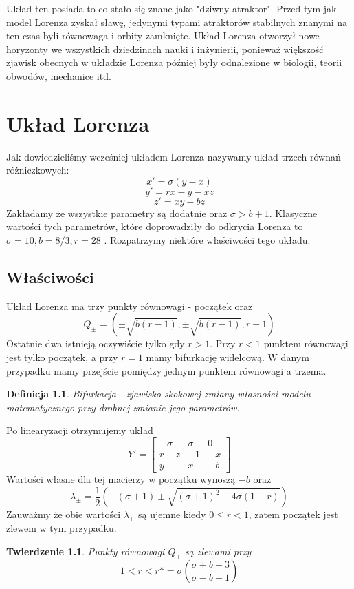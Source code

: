 \documentclass[12pt]{report}
\newtheorem{theorem}{Twierdzenie}
\newtheorem{definition}{Definicja}
\begin{document}
	\par Układ ten posiada to co stało się znane jako "dziwny atraktor". Przed tym jak model Lorenza zyskał sławę, jedynymi typami atraktorów stabilnych znanymi na ten czas byli równowaga i orbity zamknięte. Układ Lorenza otworzył nowe horyzonty we wszystkich dziedzinach nauki i inżynierii, ponieważ większość zjawisk obecnych w układzie Lorenza później były odnalezione w biologii, teorii obwodów, mechanice itd. \cite{HSD}

\chapter{Układ Lorenza}
	\par Jak dowiedzieliśmy wcześniej układem Lorenza nazywamy układ trzech równań różniczkowych:
		\[ x' = \sigma (y - x) \]
		\[ y' = rx - y - xz \]
		\[ z' = xy - bz \]
	Zakładamy że wszystkie parametry są dodatnie oraz $\sigma > b + 1$. Klasyczne wartości tych parametrów, które doprowadziły do odkrycia Lorenza to $\sigma = 10, b = 8/3, r = 28$ \cite{L}. Rozpatrzymy niektóre właściwości tego układu.

	\section{Właściwości}
	\par Układ Lorenza ma trzy punkty równowagi - początek oraz
		\[ Q_{\pm} = (\pm \sqrt{b(r - 1)}, \pm \sqrt{b(r - 1)}, r - 1) \]
	Ostatnie dwa istnieją oczywiście tylko gdy $r > 1$. Przy $r < 1$ punktem równowagi jest tylko początek, a przy $r = 1$ mamy bifurkację widelcową. W danym przypadku mamy przejście pomiędzy jednym punktem równowagi a trzema.
	\begin{definition}
		Bifurkacja - zjawisko skokowej zmiany własności modelu matematycznego przy drobnej zmianie jego parametrów.
	\end{definition}
	
	\par Po linearyzacji otrzymujemy układ
		\[ Y' = \begin{bmatrix}
					-\sigma & \sigma & 0 \\
					r-z & -1 & -x \\
					y & x & -b
				\end{bmatrix}
		\]
	Wartości własne dla tej macierzy w początku wynoszą $-b$ oraz
		\[ \lambda_{\pm} = \frac{1}{2} (-(\sigma + 1) \pm \sqrt{(\sigma + 1)^2 - 4\sigma (1 - r)}) \]
	Zauważmy że obie wartości $\lambda_{\pm}$ są ujemne kiedy $0 \le r < 1$, zatem początek jest zlewem w tym przypadku.
	\begin{theorem}
		Punkty równowagi $Q_{\pm}$ są zlewami przy
		\[ 1 < r < r* = \sigma (\frac{\sigma + b + 3}{\sigma - b - 1}) \]
	\end{theorem}
	
\end{document}
